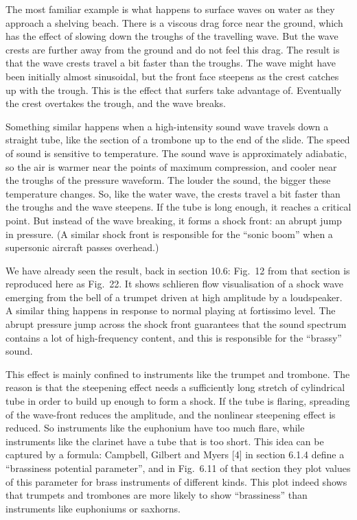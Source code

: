   The most familiar example is what happens to surface waves on water as they 
  approach a shelving beach. There is a viscous drag force near the ground, 
  which has the effect of slowing down the troughs of the travelling wave. But 
  the wave crests are further away from the ground and do not feel this drag. 
  The result is that the wave crests travel a bit faster than the troughs. The 
  wave might have been initially almost sinusoidal, but the front face steepens 
  as the crest catches up with the trough. This is the effect that surfers take 
  advantage of. Eventually the crest overtakes the trough, and the wave breaks. 

  Something similar happens when a high-intensity sound wave travels down a 
  straight tube, like the section of a trombone up to the end of the slide. The 
  speed of sound is sensitive to temperature. The sound wave is approximately 
  adiabatic, so the air is warmer near the points of maximum compression, and 
  cooler near the troughs of the pressure waveform. The louder the sound, the 
  bigger these temperature changes. So, like the water wave, the crests travel 
  a bit faster than the troughs and the wave steepens. If the tube is long 
  enough, it reaches a critical point. But instead of the wave breaking, it 
  forms a shock front: an abrupt jump in pressure. (A similar shock front is 
  responsible for the “sonic boom” when a supersonic aircraft passes overhead.) 

  We have already seen the result, back in section 10.6: Fig.\ 12 from that 
  section is reproduced here as Fig.\ 22. It shows schlieren flow visualisation 
  of a shock wave emerging from the bell of a trumpet driven at high amplitude 
  by a loudspeaker. A similar thing happens in response to normal playing at 
  fortissimo level. The abrupt pressure jump across the shock front guarantees 
  that the sound spectrum contains a lot of high-frequency content, and this is 
  responsible for the “brassy” sound. 


  This effect is mainly confined to instruments like the trumpet and trombone. 
  The reason is that the steepening effect needs a sufficiently long stretch of 
  cylindrical tube in order to build up enough to form a shock. If the tube is 
  flaring, spreading of the wave-front reduces the amplitude, and the nonlinear 
  steepening effect is reduced. So instruments like the euphonium have too much 
  flare, while instruments like the clarinet have a tube that is too short. 
  This idea can be captured by a formula: Campbell, Gilbert and Myers [4] in 
  section 6.1.4 define a “brassiness potential parameter”, and in Fig.\ 6.11 of 
  that section they plot values of this parameter for brass instruments of 
  different kinds. This plot indeed shows that trumpets and trombones are more 
  likely to show “brassiness” than instruments like euphoniums or saxhorns. 

